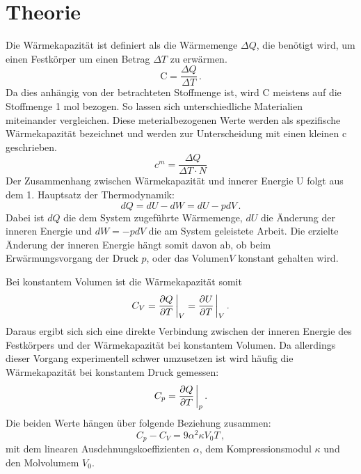\section{Theorie}
\label{sec:Theorie}

Die Wärmekapazität ist definiert als die Wärmemenge $\Delta Q$, die benötigt wird, um einen Festkörper um einen Betrag $\Delta T$ zu erwärmen.
\begin{equation}
	\text{C} =  \frac{\Delta Q}{\Delta T} \,.
	\label{eq:C-Def}
\end{equation}
Da dies anhängig von der betrachteten Stoffmenge ist, wird C meistens auf die Stoffmenge 1 mol bezogen. So lassen sich unterschiedliche Materialien miteinander vergleichen. Diese meterialbezogenen Werte werden als spezifische Wärmekapazität bezeichnet und werden zur Unterscheidung mit einen kleinen c geschrieben.
\begin{equation}	
	c^m = \frac{\Delta Q}{\Delta T \cdot N}
	\label{eq:c_mol}
\end{equation}
Der Zusammenhang zwischen Wärmekapazität und innerer Energie U folgt aus dem 1. Hauptsatz der Thermodynamik:
\begin{equation}
	dQ = dU - dW = dU - pdV \,.
	\label{eq:1.Haupt}
\end{equation}
Dabei ist $dQ$ die dem System zugeführte Wärmemenge, $dU$ die Änderung der inneren Energie und $dW = - pdV$ die am System geleistete Arbeit.
Die erzielte Änderung der inneren Energie hängt somit davon ab, ob beim Erwärmungsvorgang der Druck $p$, oder das Volumen$V$ konstant gehalten wird.

Bei konstantem Volumen ist die Wärmekapazität somit
\begin{equation}
	C_V = \pdv{Q}{T}\eval_V = \pdv{U}{T}\eval_V \,.
	\label{eq:cv_algemein}
\end{equation}
Daraus ergibt sich sich eine direkte Verbindung zwischen der inneren Energie des Festkörpers und der Wärmekapazität bei konstantem Volumen. Da allerdings dieser Vorgang experimentell schwer umzusetzen ist wird häufig die Wärmekapazität bei konstantem Druck gemessen:
\begin{equation}
	C_p = \pdv{Q}{T}\eval_p \,.
	\label{eq:cp_algemein}
\end{equation}
Die beiden Werte hängen über folgende Beziehung zusammen:
\begin{equation}
	C_p - C_V = 9 \alpha^2 \kappa V_0 T \,,
\end{equation}
mit dem linearen Ausdehnungskoeffizienten $\alpha$, dem Kompressionsmodul $\kappa$ und den Molvolumem $V_0$.

